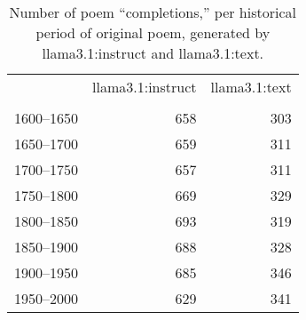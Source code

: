 \begin{table}[H]
  \centering
  \small
  \singlespacing
  \begin{tabular}{lrr}
  \toprule
   & llama3.1:instruct & llama3.1:text \\
   &  &  \\
  \midrule
  1600--1650 & 658 & 303 \\
  1650--1700 & 659 & 311 \\
  1700--1750 & 657 & 311 \\
  1750--1800 & 669 & 329 \\
  1800--1850 & 693 & 319 \\
  1850--1900 & 688 & 328 \\
  1900--1950 & 685 & 346 \\
  1950--2000 & 629 & 341 \\
  \bottomrule
  \end{tabular}
  \caption{Number of poem ``completions,'' per historical period of original poem, generated by llama3.1:instruct and llama3.1:text.}
  \label{tab:num_poems_instruct_text}
\end{table}